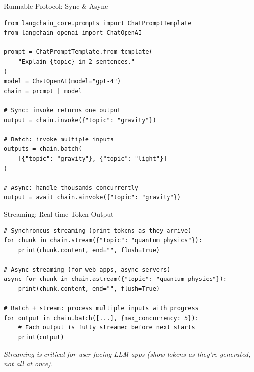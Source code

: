 \documentclass[aspectratio=169,11pt]{beamer}
\begin{document}
\begin{frame}[fragile]{Runnable Protocol: Sync & Async}
  \begin{codebox}
\begin{lstlisting}
from langchain_core.prompts import ChatPromptTemplate
from langchain_openai import ChatOpenAI

prompt = ChatPromptTemplate.from_template(
    "Explain {topic} in 2 sentences."
)
model = ChatOpenAI(model="gpt-4")
chain = prompt | model

# Sync: invoke returns one output
output = chain.invoke({"topic": "gravity"})

# Batch: invoke multiple inputs
outputs = chain.batch(
    [{"topic": "gravity"}, {"topic": "light"}]
)

# Async: handle thousands concurrently
output = await chain.ainvoke({"topic": "gravity"})
\end{lstlisting}
  \end{codebox}
\end{frame}

\begin{frame}[fragile]{Streaming: Real-time Token Output}
  \begin{codebox}
\begin{lstlisting}
# Synchronous streaming (print tokens as they arrive)
for chunk in chain.stream({"topic": "quantum physics"}):
    print(chunk.content, end="", flush=True)

# Async streaming (for web apps, async servers)
async for chunk in chain.astream({"topic": "quantum physics"}):
    print(chunk.content, end="", flush=True)

# Batch + stream: process multiple inputs with progress
for output in chain.batch([...], {max_concurrency: 5}):
    # Each output is fully streamed before next starts
    print(output)
\end{lstlisting}
  \end{codebox}

  \vspace{0.12em}
  \small \textit{Streaming is critical for user-facing LLM apps (show tokens as they're generated, not all at once).}
\end{frame}
\end{document}

